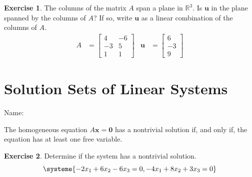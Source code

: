 \documentclass[10pt]{book}
\newcommand{\boxcolor}{gray!30}
\newenvironment{boxme}{\begin{mdframed}[backgroundcolor=\boxcolor,linewidth=0pt,nobreak=true]}{\end{mdframed}}
\theoremstyle{definition}
\newtheorem{exercise}{Exercise}[section]
\newcommand{\name}[1][2.5in]{\vspace{-2.3em}\hfill Name: \underline{\hspace{#1}}}
\newcommand{\R}{\mathbb{R}}
\newcommand{\vect}[1]{\ensuremath{\boldsymbol{\mathbf{#1}}}}
\begin{document}
\begin{exercise} %
	The columns of the matrix $A$ span a plane in $\R^3$. Is $\vect{u}$ in the plane spanned by the columns of $A$? If so, write $\vect{u}$ as a linear combination of the columns of $A$.
	\begin{align*}
	A &= \begin{bmatrix}4&-6\\-3&5\\1&1\end{bmatrix} &
	\vect{u} &= \begin{bmatrix}6\\-3\\9\end{bmatrix}
	\end{align*}
\end{exercise}
\vfill


\newpage

\section{Solution Sets of Linear Systems}
\name[2in]

\begin{boxme}
	The homogeneous equation $A\vect{x}=\vect{0}$ has a nontrivial solution if, and only if, the equation has at least one free variable.
\end{boxme}
\begin{exercise} %
	Determine if the system has a nontrivial solution.
	$$\systeme{-2x_1+6x_2-6x_3=0,-4x_1+8x_2+3x_3=0}$$
\end{exercise}
\vfill
\end{document}
